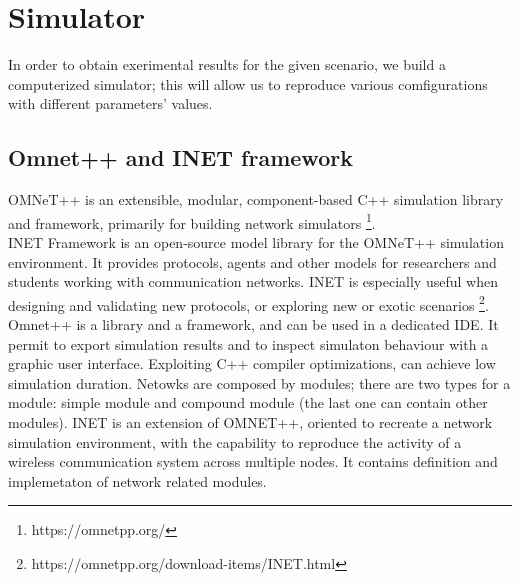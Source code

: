 %
\chapter{Simulator}\label{simulator}
In order to obtain exerimental results for the given scenario, we build a computerized simulator;
this will allow us to reproduce various comfigurations with different parameters' values.\\
\section{Omnet++ and INET framework}
OMNeT++ is an extensible, modular, component-based C++ simulation library and framework, 
primarily for building network simulators \footnote{https://omnetpp.org/}.\\
INET Framework is an open-source model library for the OMNeT++ simulation environment. 
It provides protocols, agents and other models for researchers and students working with 
communication networks. INET is especially useful when designing and validating new protocols, 
or exploring new or exotic scenarios \footnote{https://omnetpp.org/download-items/INET.html}.\\
Omnet++ is a library and a framework, and can be used in a dedicated IDE. It permit to export simulation results
and to inspect simulaton behaviour with a graphic user interface. Exploiting C++ compiler optimizations, can achieve low simulation duration.
Netowks are composed by modules; there are two types for a module: simple module and compound module (the last one can contain other modules).
INET is an extension of OMNET++, oriented to recreate a network simulation environment, with the capability to reproduce the activity
of a wireless communication system across multiple nodes. It contains definition and implemetaton of network related modules.
